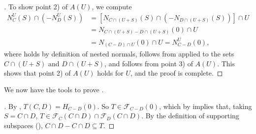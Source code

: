 \documentclass{article}
\theoremstyle{plain}
\theoremstyle{definition}
\theoremstyle{remark}
\begin{document}
\begin{proof}[\hypertarget{loc:decomposition_of_supporting_subspaces_of_differences.proof}Proof of \Cref{loc:decomposition_of_supporting_subspaces_of_differences.statement}]
To show point 2) of $A(U)$, we compute
\begin{align}
N_C^U(S) \cap (-N_D^U(S)) &= [N_{C \cap (U+S)}(S) \cap (-N_{D \cap (U+S)}(S))] \cap U \label{eq:normals:1}\\
&= N_{C \cap (U+S) - D \cap (U+S)}(0) \cap U \label{eq:normals:2}\\
&=N_{(C-D)\cap U}(0) \cap U = N_{C-D}^U(0), \label{eq:normals:3}
\end{align}
where  holds by definition of nested normals,  follows from  applied to the sets $C  \cap (U+S)$ and $D \cap (U+S)$, and  follows from point 3) of $A(U)$. This shows that point 2) of $A(U)$ holds for $U$, and the proof is complete.
\end{proof}
We now have the tools to prove .
\begin{proof}[\hypertarget{loc:containment_of_the_intersection_in_the_joint_supporting_subspace.proof}Proof of \Cref{loc:containment_of_the_intersection_in_the_joint_supporting_subspace.statement}]

By ,
$T(C, D) = H_{C-D}(0)$. So $T \in \mathcal{F}_{C-D}(0)$, which
by  implies that,
taking $S = C \cap D$, $T \in \mathcal{F}_C(C \cap D) \cap \mathcal{F}_D(C \cap D)$.
By the definition of supporting subspaces (),
$C \cap D - C \cap D \subseteq T$.
\end{proof}
\end{document}
